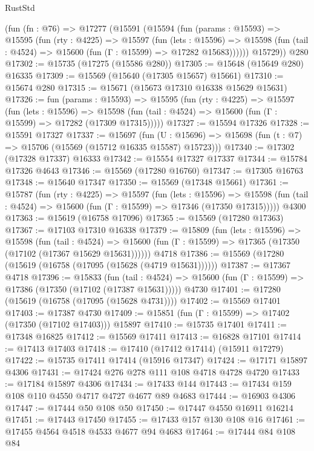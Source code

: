 \begin{lexlean}{RustStd}
\begin{coremodule}
    (fun (fn : @76) =>
    @17277
      (@15591
        (@15594
          (fun (params : @15593) =>
          @15595
            (fun (rty : @4225) =>
            @15597
              (fun (lets : @15596) =>
              @15598 (fun (tail : @4524) => @15600 (fun (Γ : @15599) => @17282 @15683))))))
        @15729))
    @280
@17302 := @15735 (@17275 (@15586 @280))
@17305 := @15648 (@15649 @280) @16335
@17309 := @15569 (@15640 (@17305 @15657) @15661)
@17310 := @15674 @280
@17315 := @15671 (@15673 @17310 @16338 @15629 @15631)
@17326 := fun (params : @15593) =>
  @15595
    (fun (rty : @4225) =>
    @15597
      (fun (lets : @15596) =>
      @15598 (fun (tail : @4524) => @15600 (fun (Γ : @15599) => @17282 (@17309 @17315)))))
@17327 := @15594 @17326
@17328 := @15591 @17327
@17337 := @15697
    (fun (U : @15696) => @15698 (fun (t : @7) => @15706 (@15569 (@15712 @16335 @15587) @15723)))
@17340 := @17302 (@17328 @17337) @16333
@17342 := @15554 @17327 @17337
@17344 := @15784 @17326 @4643
@17346 := @15569 (@17280 @16760)
@17347 := @17305 @16763
@17348 := @15640 @17347
@17350 := @15569 (@17348 @15661)
@17361 := @15787
    (fun (rty : @4225) =>
    @15597
      (fun (lets : @15596) =>
      @15598 (fun (tail : @4524) => @15600 (fun (Γ : @15599) => @17346 (@17350 @17315)))))
    @4300
@17363 := @15619 (@16758 @17096)
@17365 := @15569 (@17280 @17363)
@17367 := @17103 @17310 @16338
@17379 := @15809
    (fun (lets : @15596) =>
    @15598
      (fun (tail : @4524) =>
      @15600 (fun (Γ : @15599) => @17365 (@17350 (@17102 (@17367 @15629 @15631))))))
    @4718
@17386 := @15569 (@17280 (@15619 (@16758 (@17095 (@15628 (@4719 @15631))))))
@17387 := @17367 @4718
@17396 := @15833
    (fun (tail : @4524) => @15600 (fun (Γ : @15599) => @17386 (@17350 (@17102 (@17387 @15631)))))
    @4730
@17401 := @17280 (@15619 (@16758 (@17095 (@15628 @4731))))
@17402 := @15569 @17401
@17403 := @17387 @4730
@17409 := @15851 (fun (Γ : @15599) => @17402 (@17350 (@17102 @17403))) @15897
@17410 := @15735 @17401
@17411 := @17348 @16825
@17412 := @15569 @17411
@17413 := @16828 @17101
@17414 := @17413 @17403
@17418 := @17410 (@17412 @17414) (@15911 @17279)
@17422 := @15735 @17411 @17414 (@15916 @17347)
@17424 := @17171 @15897 @4306
@17431 := @17424 @276 @278 @111 @108 @4718 @4728 @4720
@17433 := @17184 @15897 @4306
@17434 := @17433 @144
@17443 := @17434 @159 @108 @110 @4550 @4717 @4727 @4677 @89 @4683
@17444 := @16903 @4306
@17447 := @17444 @50 @108 @50
@17450 := @17447 @4550 @16911 @16214
@17451 := @17443 @17450
@17455 := @17433 @157 @130 @108 @16
@17461 := @17455 @4564 @4518 @4533 @4677 @94 @4683
@17464 := @17444 @84 @108 @84

\end{coremodule}
\end{lexlean}

